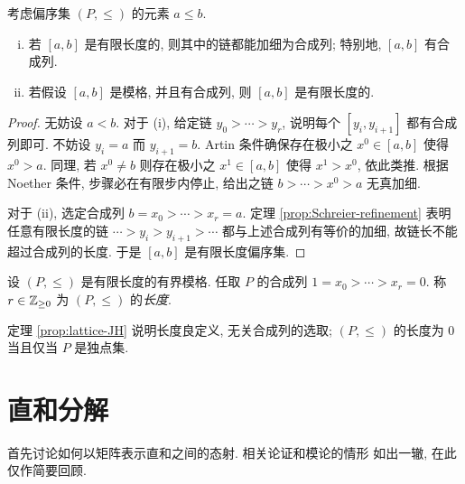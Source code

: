 \begin{lemma}\label{prop:lattice-composition-series}
	考虑偏序集 $(P, \leq)$ 的元素 $a \leq b$.
	\begin{enumerate}[(i)]
		\item 若 $[a, b]$ 是有限长度的, 则其中的链都能加细为合成列; 特别地, $[a,b]$ 有合成列.
		\item 若假设 $[a, b]$ 是模格, 并且有合成列, 则 $[a,b]$ 是有限长度的.
	\end{enumerate}
\end{lemma}
\begin{proof}
	无妨设 $a < b$. 对于 (i), 给定链 $y_0 > \cdots > y_r$, 说明每个 $[y_i, y_{i+1}]$ 都有合成列即可. 不妨设 $y_i = a$ 而 $y_{i+1} = b$. Artin 条件确保存在极小之 $x^0 \in [a, b]$ 使得 $x^0 > a$. 同理, 若 $x^0 \neq b$ 则存在极小之 $x^1 \in [a, b]$ 使得 $x^1 > x^0$, 依此类推. 根据 Noether 条件, 步骤必在有限步内停止, 给出之链 $b > \cdots > x^0 > a$ 无真加细.

	对于 (ii), 选定合成列 $b = x_0 > \cdots > x_r = a$. 定理 \ref{prop:Schreier-refinement} 表明任意有限长度的链 $\cdots > y_i > y_{i+1} > \cdots$ 都与上述合成列有等价的加细, 故链长不能超过合成列的长度. 于是 $[a, b]$ 是有限长度偏序集.
\end{proof}

\begin{definition}\label{def:lattice-length}
	设 $(P, \leq)$ 是有限长度的有界模格. 任取 $P$ 的合成列 $1 = x_0 > \cdots > x_r = 0$. 称 $r \in \mathbb{Z}_{\geq 0}$ 为 $(P, \leq)$ 的\emph{长度}.
\end{definition}

定理 \ref{prop:lattice-JH} 说明长度良定义, 无关合成列的选取; $(P, \leq)$ 的长度为 $0$ 当且仅当 $P$ 是独点集.

\section{直和分解}\label{sec:direct-sum}
首先讨论如何以矩阵表示直和之间的态射. 相关论证和模论的情形 \cite[\S 6.3]{Li1} 如出一辙, 在此仅作简要回顾.

